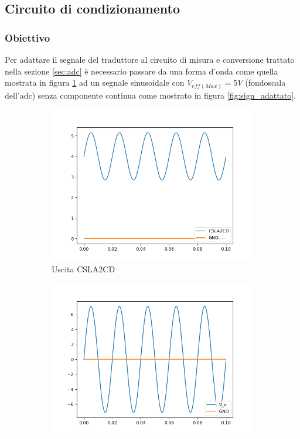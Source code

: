 \subsection{Circuito di condizionamento}
\subsubsection{Obiettivo}
Per adattare il segnale del traduttore al circuito di misura e conversione
trattato nella sezione \ref{sec:adc} è necessario passare da una forma d'onda
come quella mostrata in figura \ref{fig:sign_trasd} ad un segnale sinusoidale
con $V_{eff(Max)} = 5V$ (fondoscala dell'adc) senza componente continua come
mostrato in figura \ref{fig:sign_adattato}.

\begin{figure}[H]
    \centering
    \begin{subfigure}{0.49\textwidth}
        \centering
        \includegraphics[scale=0.5]{corrente/sign_trasd.png}
        \caption{Uscita CSLA2CD}
        \label{fig:sign_trasd}
    \end{subfigure}
    \begin{subfigure}{0.49\textwidth}
        \centering
        \includegraphics[scale=0.5]{corrente/sign_adattato.png}

\end{subfigure}
\end{figure}
